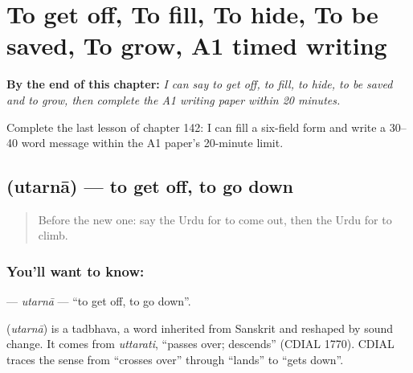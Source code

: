 
\chapter{To get off, To fill, To hide, To be saved, To grow, A1 timed writing}
\label{ch:ur-to-get-off-to-fill-to-hide-to-be-saved-to-grow}

\begin{chapteropening}
\textbf{By the end of this chapter:} \emph{I can say to get off, to fill, to hide, to be saved and to grow, then complete the A1 writing paper within 20 minutes.}

Complete the last lesson of chapter 142: I can fill a six-field form and write a 30–40 word message within the A1 paper's 20-minute limit.
\end{chapteropening}

\section[\texorpdfstring{\ur{اترنا} (utarnā)}{اترنا (utarnā)}]{ (utarnā) — to get off, to go down}

\label{lesson:UR-C142-utarna}



\begin{quote}
Before the new one: say the Urdu for to come out, then the Urdu for to climb.
\end{quote}

\subsection*{You'll want to know: }
\textbf{} — \emph{utarnā} — \textquotedblleft{}to get off, to go down\textquotedblright{}.

\begin{cousinweb}
\textbf{} (\emph{utarnā}) is a tadbhava, a word inherited from Sanskrit and reshaped by sound change. It comes from \emph{uttarati}, \textquotedblleft{}passes over; descends\textquotedblright{} (CDIAL 1770). CDIAL traces the sense from \textquotedblleft{}crosses over\textquotedblright{} through \textquotedblleft{}lands\textquotedblright{} to \textquotedblleft{}gets down\textquotedblright{}.
\end{cousinweb}

